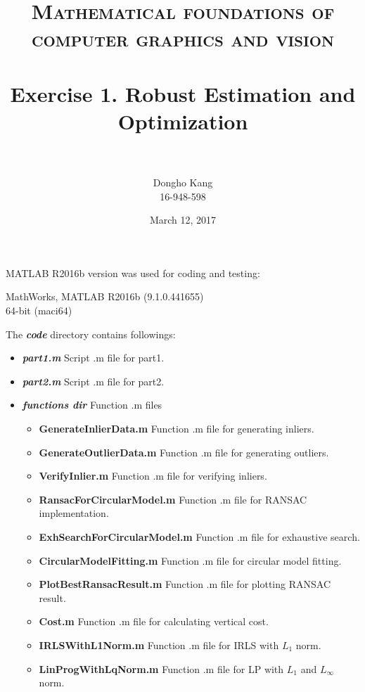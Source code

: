 \documentclass[paper=a4, fontsize=11pt]{scrartcl} %
\title{	
\normalfont \normalsize 
\textsc{Mathematical foundations of computer graphics and vision} \\ [25pt] %
\horrule{0.5pt} \\[0.4cm] %
\huge Exercise 1. Robust Estimation and Optimization \\ %
\horrule{2pt} \\[0.5cm] %
}
\author{Dongho Kang \\ \small 16-948-598} %
\date{\normalsize March 12, 2017} %
\numberwithin{equation}{section} %
\numberwithin{figure}{section} %
\numberwithin{table}{section} %
\newcommand{\filename}[1]{\textbf{\textit{#1}}}
\newcommand{\funcname}[1]{\textbf{#1}}
\begin{document}
\maketitle %


MATLAB R2016b version was used for coding and testing:

\begin{center}
MathWorks, MATLAB R2016b (9.1.0.441655) \\
64-bit (maci64) 
\end{center}

The \filename{code} directory contains followings:

\begin{itemize}
	\item \filename{part1.m} \quad Script .m file for part1.
	\item \filename{part2.m} \quad Script .m file for part2.
	\item \filename{functions dir} \quad Function .m files 
		\begin{itemize}
			\item \funcname{GenerateInlierData.m} \quad Function .m file for generating inliers.
			\item \funcname{GenerateOutlierData.m} \quad Function .m file for generating outliers.
			\item \funcname{VerifyInlier.m} \quad Function .m file for verifying inliers.
			\item \funcname{RansacForCircularModel.m} \quad Function .m file for RANSAC implementation.
			\item \funcname{ExhSearchForCircularModel.m} \quad Function .m file for exhaustive search.			
			\item \funcname{CircularModelFitting.m} \quad Function .m file for circular model fitting. 		
			\item \funcname{PlotBestRansacResult.m}  \quad Function .m file for plotting RANSAC result.			
			\item \funcname{Cost.m}	\quad Function .m file for calculating vertical cost.						
			\item \funcname{IRLSWithL1Norm.m} \quad Function .m file for IRLS with $L_{1}$ norm.
			\item \funcname{LinProgWithLqNorm.m} \quad Function .m file for LP with $L_{1}$ and $L_{\infty}$ norm. 							
		\end{itemize}
\end{itemize}
\end{document}
